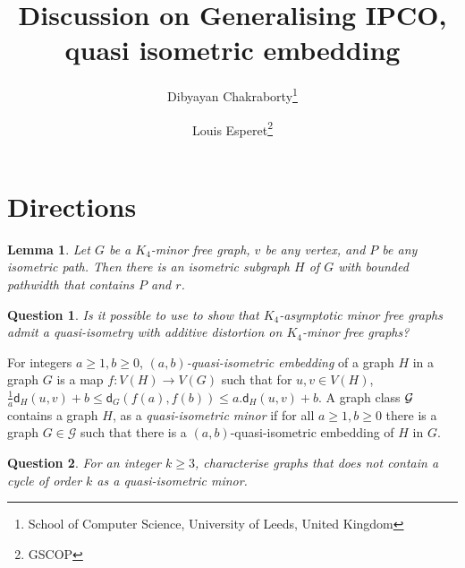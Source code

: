 \documentclass[a4paper]{article}
\title{Discussion on Generalising IPCO, quasi isometric embedding}
\author{Dibyayan Chakraborty\footnote{School of Computer Science, University of Leeds, United Kingdom}
 \and Louis Esperet\footnote{GSCOP}}
\date{}
\newcommand{\distG}[3]{\mathsf{d}_{#1}\left(#2,#3\right)}
\newtheorem{Question}{Question}
\newtheorem{lemma}{Lemma}
\begin{document}
\maketitle

\section{Directions}
 
 \newcommand{\quasipath}[2]{(#1,#2)\text{-path}\xspace}
 \begin{lemma}\label{lem:series-parallel}
 	Let $G$ be a $K_4$-minor free graph, $v$ be any vertex, and $P$ be any isometric path. Then there is an isometric subgraph $H$ of $G$ with bounded pathwidth that contains $P$ and $r$.
 \end{lemma}
 
 \begin{Question}
 	Is it possible to use  to show that $K_4$-asymptotic minor free graphs admit a quasi-isometry with additive distortion on $K_4$-minor free graphs?
 \end{Question}
 
 For integers $a\geq 1,b\geq 0$, \emph{$(a,b)$-quasi-isometric embedding} of a graph $H$ in a graph $G$ is a map $f\colon V(H)\rightarrow V(G)$ such that for  $u,v\in V(H)$, $\frac{1}{a}\distG{H}{u}{v}+b\leq \distG{G}{f(a)}{f(b)} \leq a.\distG{H}{u}{v}+b$.
 A graph class $\cal G$ contains a graph $H$, as a \emph{quasi-isometric minor} if for all $a\geq 1,b\geq 0$ there is a graph $G\in \mathcal{G}$ such that there is a  $(a,b)$-quasi-isometric embedding of $H$ in $G$. 
 
 \begin{Question}
 	For an integer $k\geq 3$, characterise graphs that does not contain a cycle of order $k$ as a quasi-isometric minor.
 \end{Question}
 
\end{document}

